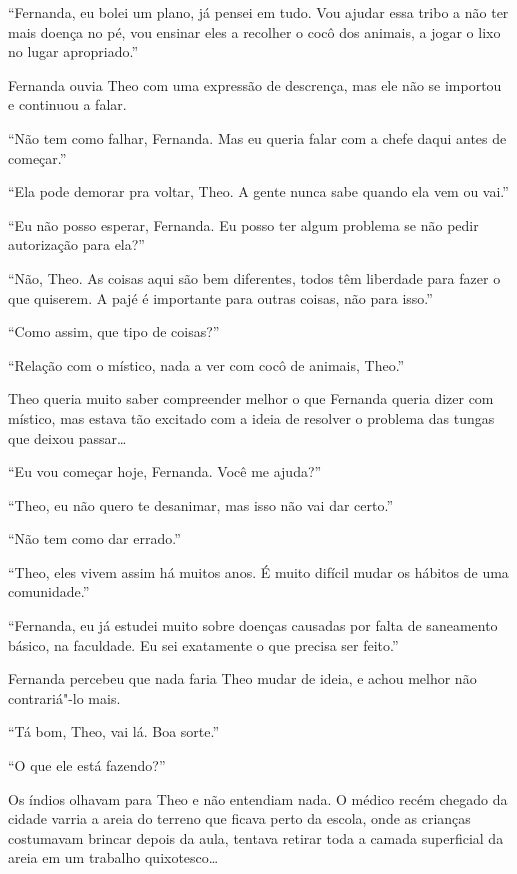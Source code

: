 ``Fernanda, eu bolei um plano, já pensei em tudo. Vou ajudar essa tribo
a não ter mais doença no pé, vou ensinar eles a recolher o cocô dos
animais, a jogar o lixo no lugar apropriado.''

Fernanda ouvia Theo com uma expressão de descrença, mas ele não se
importou e continuou a falar.

``Não tem como falhar, Fernanda. Mas eu queria falar com a chefe daqui
antes de começar.''

``Ela pode demorar pra voltar, Theo. A gente nunca sabe quando ela vem
ou vai.''

``Eu não posso esperar, Fernanda. Eu posso ter algum problema se não
pedir autorização para ela?''

``Não, Theo. As coisas aqui são bem diferentes, todos têm liberdade para
fazer o que quiserem. A pajé é importante para outras coisas, não para
isso.''

``Como assim, que tipo de coisas?''

``Relação com o místico, nada a ver com cocô de animais, Theo.''

Theo queria muito saber compreender melhor o que Fernanda queria dizer
com místico, mas estava tão excitado com a ideia de resolver o problema
das tungas que deixou passar\ldots{}

``Eu vou começar hoje, Fernanda. Você me ajuda?''

``Theo, eu não quero te desanimar, mas isso não vai dar certo.''

``Não tem como dar errado.''

``Theo, eles vivem assim há muitos anos. É muito difícil mudar os
hábitos de uma comunidade.''

``Fernanda, eu já estudei muito sobre doenças causadas por falta de
saneamento básico, na faculdade. Eu sei exatamente o que precisa ser
feito.''

Fernanda percebeu que nada faria Theo mudar de ideia, e achou melhor não
contrariá"-lo mais.

``Tá bom, Theo, vai lá. Boa sorte.''

\asterisc


``O que ele está fazendo?''

Os índios olhavam para Theo e não entendiam nada. O médico recém chegado
da cidade varria a areia do terreno que ficava perto da escola, onde as
crianças costumavam brincar depois da aula, tentava retirar toda a
camada superficial da areia em um trabalho quixotesco\ldots{}

